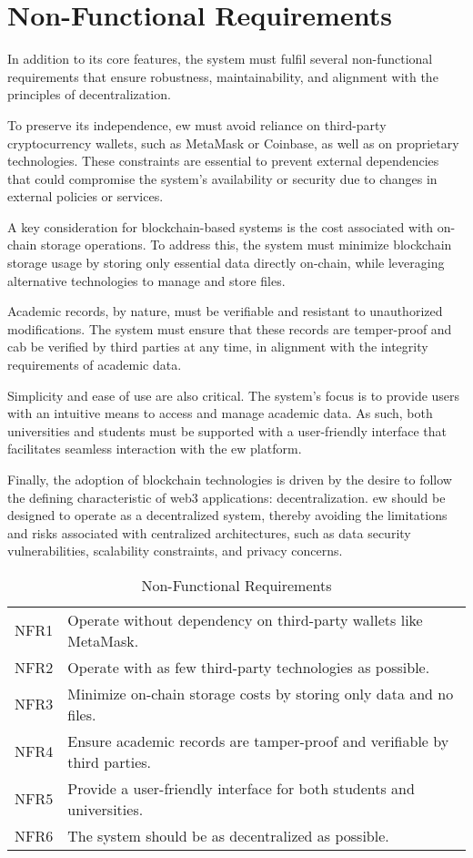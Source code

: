\section{Non-Functional Requirements}
\label{sec:nonFunctionalRequirements}
In addition to its core features, the system must fulfil several non-functional requirements that ensure robustness, maintainability, and alignment with the principles of decentralization. 

To preserve its independence, \acrshort{ew} must avoid reliance on third-party cryptocurrency wallets, such as MetaMask or Coinbase, as well as on proprietary technologies. These constraints are essential to prevent external dependencies that could compromise the system’s availability or security due to changes in external policies or services.

A key consideration for blockchain-based systems is the cost associated with on-chain storage operations. To address this, the system must minimize blockchain storage usage by storing only essential data directly on-chain, while leveraging alternative technologies to manage and store files.

Academic records, by nature, must be verifiable and resistant to unauthorized modifications. The system must ensure that these records are temper-proof and cab be verified by third parties at any time, in alignment with the integrity requirements of academic data.

Simplicity and ease of use are also critical. The system's focus is to provide users with an intuitive means to access and manage academic data. As such, both universities and students must be supported with a user-friendly interface that facilitates seamless interaction with the \acrshort{ew} platform.

Finally, the adoption of blockchain technologies is driven by the desire to follow the defining characteristic of \Gls{web3} applications: decentralization. \acrshort{ew} should be designed to operate as a decentralized system, thereby avoiding the limitations and risks associated with centralized architectures, such as data security vulnerabilities, scalability constraints, and privacy concerns.

\begin{table}
\centering
\caption{Non-Functional Requirements}
\label{tab:nonFuncReq}
\begin{tabular}{|p{1.0cm}|p{11cm}|}
\hline
NFR1 & Operate without dependency on third-party wallets like MetaMask. \\
NFR2 & Operate with as few third-party technologies as possible. \\
NFR3 & Minimize on-chain storage costs by storing only data and no files. \\
NFR4 & Ensure academic records are tamper-proof and verifiable by third parties. \\
NFR5 & Provide a user-friendly interface for both students and universities. \\
NFR6 & The system should be as decentralized as possible. \\
\hline
\end{tabular}
\end{table}


